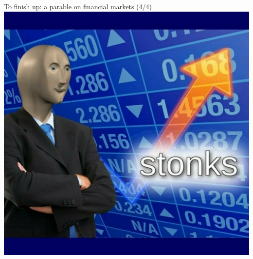 \begin{frame}{To finish up: a parable on financial markets (4/4)}
	\centering \includegraphics[width=0.6\paperwidth]{pics/yy4}
\end{frame}



